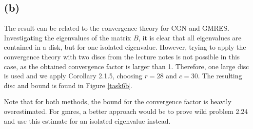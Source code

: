 \subsection{(b)}
The result can be related to the convergence theory for CGN and GMRES. Investigating the eigenvalues of the matrix $B$, it is clear that all eigenvalues are contained in a disk, but for one isolated eigenvalue. However, trying to apply the convergence theory with two discs from the lecture notes is not possible in this case, as the obtained convergence factor is larger than 1. Therefore, one large disc is used and we apply Corollary 2.1.5, choosing $r = 28$ and $c =30 $. The resulting disc and bound is found in Figure \ref{task6b}. 

Note that for both methods, the bound for the convergence factor is heavily overestimated. For gmres, a better approach would be to prove wiki problem 2.24 and use this estimate for an isolated eigenvalue instead.

